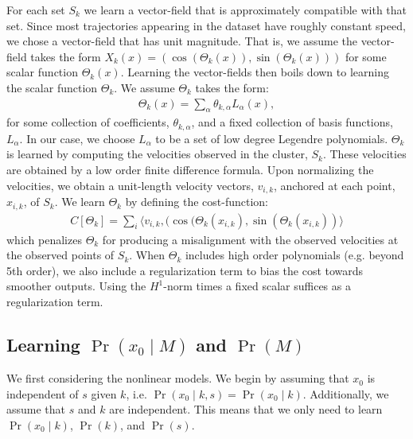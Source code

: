 \documentclass[letterpaper,10pt,conference]{ieeeconf}
\begin{document}
  For each set $S_k$ we learn a vector-field that is approximately compatible with that set.
  Since most trajectories appearing in the dataset have roughly constant speed, we chose a vector-field that has unit magnitude. 
  That is, we assume the vector-field takes the form $X_k(x) = \left( \cos( \Theta_k(x) ) , \sin(\Theta_k(x)) \right)$ for some scalar function $\Theta_k(x)$.
  Learning the vector-fields then boils down to learning the scalar function $\Theta_k$.
  We assume $\Theta_k$ takes the form:
  \begin{align*}
  	\Theta_k(x) = \sum_{\alpha} \theta_{k,\alpha} L_{\alpha}(x),
  \end{align*}
  for some collection of coefficients, $\theta_{k,\alpha}$, and a fixed collection of basis functions, $L_{\alpha}$.
  In our case, we choose $L_{\alpha}$ to be a set of low degree Legendre polynomials.
 $\Theta_k$ is learned by computing the velocities observed in the cluster, $S_k$.
  These velocities are obtained by a low order finite difference formula.
  Upon normalizing the velocities, we obtain a unit-length velocity vectors, $v_{i,k}$, anchored at each point, $x_{i,k}$, of $S_k$.
  We learn $\Theta_k$ by defining the cost-function:
  \begin{align*}
  	C[ \Theta_k] = \sum_i \langle v_{i,k} , ( \cos(\Theta_k( x_{i,k}) , \sin( \Theta_k( x_{i,k} ) ) \rangle
  \end{align*}
  which penalizes $\Theta_k$ for producing a misalignment with the observed velocities at the observed points of $S_k$.
  When $\Theta_{k}$ includes high order polynomials (e.g. beyond 5th order), we also include a regularization term to bias the cost towards smoother outputs.
  Using the $H^1$-norm times a fixed scalar suffices as a regularization term. 
  
  \subsection{Learning $\Pr( x_0 \mid M)$ and $\Pr(M)$}
  
We first considering the nonlinear models.
  We begin by assuming that $x_0$ is independent of $s$ given $k$, i.e. $\Pr( x_0 \mid k,s) = \Pr(x_0 \mid k)$.
  Additionally, we assume that $s$ and $k$ are independent.
  This means that we only need to learn $\Pr( x_0 \mid k)$, $\Pr(k)$, and $\Pr(s)$.
  
\end{document}
